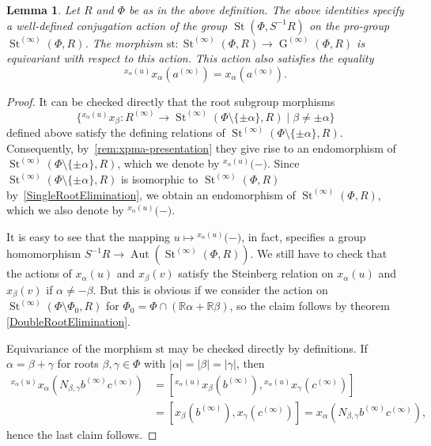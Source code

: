 \documentclass{article}
\numberwithin{equation}{section}
\newtheorem{lemma}{Lemma} \numberwithin{lemma}{section}
\theoremstyle{definition}
\theoremstyle{remark}
\DeclareMathOperator\St{St}
\DeclareMathOperator\GG{G}
\DeclareMathOperator\Torus{T}
\DeclareMathOperator\Aut{Aut}
\newcommand{\up}[2]{{^{#1}\!{#2}}}
\begin{document}
\begin{lemma}\label{SteinbergLocalAction} 
 Let $R$ and $\Phi$ be as in the above definition.
 The above identities specify a well-defined conjugation action of the group \(\St(\Phi, S^{-1} R)\) on the pro-group \(\St^{(\infty)}(\Phi, R)\).
 The morphism \(\mathrm{st} \colon \St^{(\infty)}(\Phi, R) \to \GG^{(\infty)}(\Phi, R)\) is equivariant with respect to this action.
 This action also satisfies the equality \[\up{x_\alpha(u)}{x_\alpha(a^{(\infty)})} = x_\alpha(a^{(\infty)}).\]
\end{lemma}
\begin{proof}
 It can be checked directly that the root subgroup morphisms \[\{\up{x_\alpha(u)} x_\beta \colon R^{(\infty)} \to \St^{(\infty)}(\Phi\setminus\{\pm\alpha\}, R) \mid \beta \neq \pm \alpha \}\] defined above satisfy the defining relations of $\St^{(\infty)}(\Phi\setminus\{\pm \alpha\}, R)$.
 Consequently, by~\cref{rem:xpma-presentation} they give rise to an endomorphism of $\St^{(\infty)}(\Phi\setminus\{\pm\alpha\}, R)$, which we denote by $\up{x_\alpha(u)}(-)$.
 Since $\St^{(\infty)}(\Phi\setminus\{\pm\alpha\}, R)$ is isomorphic to $\St^{(\infty)}(\Phi, R)$ by~\cref{SingleRootElimination}, we obtain an endomorphism of $\St^{(\infty)}(\Phi, R)$, which we also denote by $\up{x_\alpha(u)}(-)$.
 
 It is easy to see that the mapping $u \mapsto \up{x_\alpha(u)}(-)$, in fact, specifies a group homomorphism $S^{-1}R \to \Aut(\St^{(\infty)}(\Phi, R))$.
 We still have to check that the actions of \(x_\alpha(u)\) and \(x_\beta(v)\) satisfy the Steinberg relation on \(x_\alpha(u)\) and \(x_\beta(v)\) if \(\alpha \neq -\beta\). But this is obvious if we consider the action on \(\St^{(\infty)}(\Phi \setminus \Phi_0, R)\) for \(\Phi_0 = \Phi \cap (\mathbb R\alpha + \mathbb R\beta)\), so the claim follows by theorem \ref{DoubleRootElimination}.

 Equivariance of the morphism \(\mathrm{st}\) may be checked directly by definitions. If \(\alpha = \beta + \gamma\) for roots \(\beta, \gamma \in \Phi\) with \(|\alpha| = |\beta| = |\gamma|\), then
 \begin{align*}
  \up{x_\alpha(u)}{x_\alpha(N_{\beta, \gamma} b^{(\infty)} c^{(\infty)})} &= [\up{x_\alpha(u)}{x_\beta(b^{(\infty)})}, \up{x_\alpha(u)}{x_\gamma(c^{(\infty)})}]\\
  &= [x_\beta(b^{(\infty)}), x_\gamma(c^{(\infty)})] = x_\alpha(N_{\beta, \gamma} b^{(\infty)} c^{(\infty)}),
 \end{align*}
 hence the last claim follows.
\end{proof}
\end{document}
